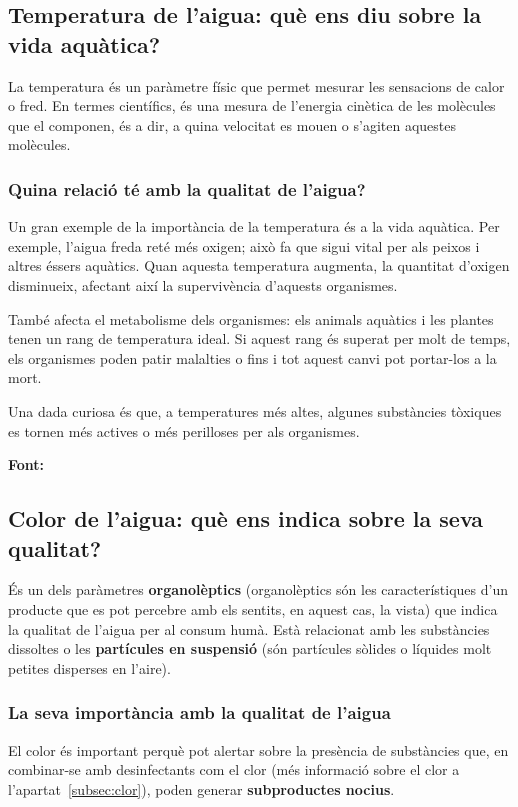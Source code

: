 \subsection{Temperatura de l’aigua: què ens diu sobre la vida aquàtica?} \label{subsec:temperatura}
La temperatura és un paràmetre físic que permet mesurar les sensacions de calor o fred. En termes científics, és una mesura de l’energia cinètica de les molècules que el componen, és a dir, a quina velocitat es mouen o s’agiten aquestes molècules.

\subsubsection{Quina relació té amb la qualitat de l'aigua?}
Un gran exemple de la importància de la temperatura és a la vida aquàtica. Per exemple, l’aigua freda reté més oxigen; això fa que sigui vital per als peixos i altres éssers aquàtics. Quan aquesta temperatura augmenta, la quantitat d’oxigen disminueix, afectant així la supervivència d’aquests organismes.

També afecta el metabolisme dels organismes: els animals aquàtics i les plantes tenen un rang de temperatura ideal. Si aquest rang és superat per molt de temps, els organismes poden patir malalties o fins i tot aquest canvi pot portar-los a la mort.

Una dada curiosa és que, a temperatures més altes, algunes substàncies tòxiques es tornen més actives o més perilloses per als organismes.

\textbf{Font:} \cite{UCM}

\subsection{Color de l’aigua: què ens indica sobre la seva qualitat?} \label{subsec:color}
És un dels paràmetres \textbf{organolèptics} (organolèptics són les característiques d'un producte que es pot percebre amb els sentits, en aquest cas, la vista) que indica la qualitat de l'aigua per al consum humà. Està relacionat amb les substàncies dissoltes o les \textbf{partícules en suspensió} (són partícules sòlides o líquides molt petites disperses en l’aire).

\subsubsection{La seva importància amb la qualitat de l'aigua}
El color és important perquè pot alertar sobre la presència de substàncies que, en combinar-se amb desinfectants com el clor (més informació sobre el clor a l'apartat~\ref{subsec:clor}), poden generar \textbf{subproductes nocius}.


